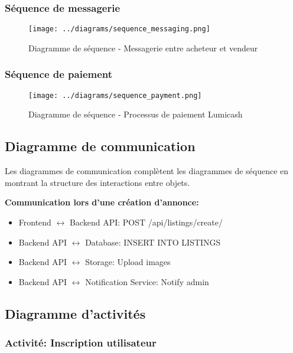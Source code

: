 \subsubsection{Séquence de messagerie}

\begin{figure}[H]
\centering
\texttt{[image: ../diagrams/sequence\_messaging.png]}
\caption{Diagramme de séquence - Messagerie entre acheteur et vendeur}
\label{fig:seq_messaging}
\end{figure}

\subsubsection{Séquence de paiement}

\begin{figure}[H]
\centering
\texttt{[image: ../diagrams/sequence\_payment.png]}
\caption{Diagramme de séquence - Processus de paiement Lumicash}
\label{fig:seq_payment}
\end{figure}

\subsection{Diagramme de communication}

Les diagrammes de communication complètent les diagrammes de séquence en montrant la structure des interactions entre objets.

\textbf{Communication lors d'une création d'annonce:}
\begin{itemize}
    \item Frontend $\leftrightarrow$ Backend API: POST /api/listings/create/
    \item Backend API $\leftrightarrow$ Database: INSERT INTO LISTINGS
    \item Backend API $\leftrightarrow$ Storage: Upload images
    \item Backend API $\leftrightarrow$ Notification Service: Notify admin
\end{itemize}

\subsection{Diagramme d'activités}

\subsubsection{Activité: Inscription utilisateur}

